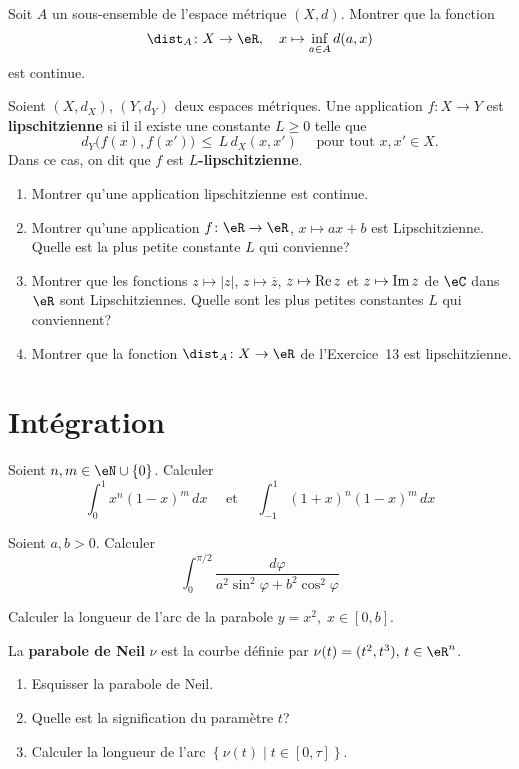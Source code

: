 \exerNico  Soit $A$ un sous-ensemble de l'espace métrique $(X,d)$.
Montrer que la fonction
$$
	\dist_A \colon X \to \eR,
	\quad x \mapsto \inf_{a \in A} d(a,x)
$$
est continue.


\exerNico  Soient $(X,d_X)$, $(Y,d_Y)$ deux espaces métriques.
Une application $f \colon X \to Y$ est {\bfseries lipschitzienne}
si il il existe une constante $L \ge 0$ telle que
$$
	d_Y \bigl( f(x), f(x') \bigr) \,\le\, L \,d_X (x,x')
	\quad \text{ pour tout } x,x' \in X.
$$
Dans ce cas, on dit que $f$ est {\bfseries $L$-lipschitzienne}.


\begin{enumerate}
	\item
	      Montrer qu'une application lipschitzienne est continue.
	\item Montrer qu'une application $f \colon \eR \to \eR$, $x \mapsto ax+b$
	      est Lipschitzienne.
	      Quelle est la plus petite constante $L$ qui convienne?

	\item Montrer que les fonctions $z \mapsto |z|$,
	      $z \mapsto \overline z$,
	      $z \mapsto {\rm Re\,} z$ et $z \mapsto {\rm Im\,} z$
	      de $\eC$ dans $\eR$ sont Lipschitziennes.
	      Quelle sont les plus petites constantes $L$ qui conviennent?
	\item Montrer que la fonction $\dist_A \colon X \to \eR$ de l'Exercice~13 est lipschitzienne.

\end{enumerate}





\section{Intégration}

\exerNico
Soient $n,m \in \eN \cup \{0\}$.
Calculer
$$
	\int_0^1 x^n (1-x)^m \,dx
	\quad \text{ et } \quad
	\int_{-1}^1 (1+x)^n (1-x)^m \,dx
$$



\exerNico
Soient $a,b >0$.
Calculer
$$
	\int_0^{\pi /2} \displaystyle \frac{d \varphi}{a^2 \sin^2 \varphi + b^2 \cos^2 \varphi}
$$


\exerNico
Calculer la longueur de l'arc de la parabole $y = x^2,\;x \in [0,b]$.

\exerNico
La {\bf parabole de Neil} $\nu$ est la courbe définie par
$\nu (t) = (t^2,t^3), \, t \in \eR^n$.
\begin{enumerate}
	\item Esquisser la parabole de Neil.

	\item Quelle est la signification du paramètre $t$?

	\item Calculer la longueur de l'arc
	      $\left\{ \nu (t) \mid t \in [0,\tau] \right\}$.
\end{enumerate}

